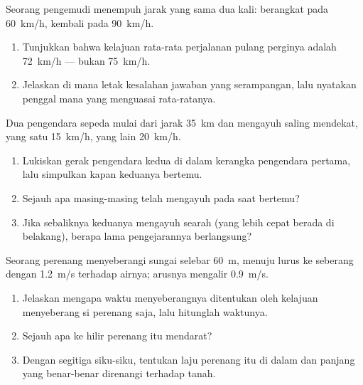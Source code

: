 \begin{exercise}[$\star\star\star$]\label{exo:g10:relative-motion:12}
Seorang pengemudi menempuh jarak yang sama dua kali: berangkat pada
\qty{60}{km/h}, kembali pada \qty{90}{km/h}.
\begin{enumerate}
  \item Tunjukkan bahwa kelajuan rata-rata perjalanan pulang perginya
        adalah \qty{72}{km/h} --- bukan \qty{75}{km/h}.
  \item Jelaskan di mana letak kesalahan jawaban yang serampangan, lalu
        nyatakan penggal mana yang menguasai rata-ratanya.
\end{enumerate}
\end{exercise}

\begin{exercise}[$\star\star\star$]\label{exo:g10:relative-motion:13}
Dua pengendara sepeda mulai dari jarak \qty{35}{km} dan mengayuh saling
mendekat, yang satu \qty{15}{km/h}, yang lain \qty{20}{km/h}.
\begin{enumerate}
  \item Lukiskan gerak pengendara kedua di dalam kerangka pengendara
        pertama, lalu simpulkan kapan keduanya bertemu.
  \item Sejauh apa masing-masing telah mengayuh pada saat bertemu?
  \item Jika sebaliknya keduanya mengayuh searah (yang lebih cepat
        berada di belakang), berapa lama pengejarannya berlangsung?
\end{enumerate}
\end{exercise}

\begin{exercise}[$\star\star\star$]\label{exo:g10:relative-motion:14}
Seorang perenang menyeberangi sungai selebar \qty{60}{m}, menuju lurus
ke seberang dengan \qty{1.2}{m/s} terhadap airnya; arusnya mengalir
\qty{0.9}{m/s}.
\begin{enumerate}
  \item Jelaskan mengapa waktu menyeberangnya ditentukan oleh kelajuan
        menyeberang si perenang saja, lalu hitunglah waktunya.
  \item Sejauh apa ke hilir perenang itu mendarat?
  \item Dengan segitiga siku-siku, tentukan laju perenang itu di dalam
         dan panjang  yang benar-benar direnangi
        terhadap tanah.
\end{enumerate}
\end{exercise}

